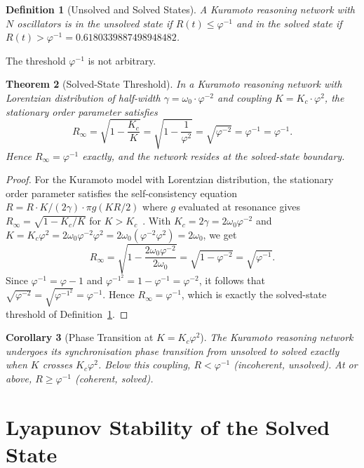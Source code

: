 \documentclass[12pt]{article}
\newtheorem{theorem}{Theorem}
\newtheorem{corollary}[theorem]{Corollary}
\newtheorem{definition}[theorem]{Definition}
\newcommand{\PHI}{\varphi}
\newcommand{\PHIINV}{\varphi^{-1}}
\newcommand{\AMOR}{\varphi^{-2}}
\begin{document}
\begin{definition}[Unsolved and Solved States]
\label{def:states}
A Kuramoto reasoning network with $N$ oscillators is in the \emph{unsolved
state} if $R(t) \le \PHIINV$ and in the \emph{solved state} if $R(t) > \PHIINV
= 0.6180339887498948482$.
\end{definition}

The threshold $\PHIINV$ is not arbitrary.

\begin{theorem}[Solved-State Threshold]
\label{thm:solved-threshold}
In a Kuramoto reasoning network with Lorentzian distribution of half-width
$\gamma = \omega_0 \cdot \AMOR$ and coupling $K = K_c \cdot \PHI^2$, the
stationary order parameter satisfies
\[
  R_\infty = \sqrt{1 - \frac{K_c}{K}} = \sqrt{1 - \frac{1}{\PHI^2}} =
  \sqrt{\AMOR} = \PHI^{-1} = \PHIINV.
\]
Hence $R_\infty = \PHIINV$ exactly, and the network resides at the solved-state
boundary.
\end{theorem}

\begin{proof}
For the Kuramoto model with Lorentzian distribution, the stationary order
parameter satisfies the self-consistency equation $R = R \cdot K/(2\gamma) \cdot
\pi g(K R / 2)$ where $g$ evaluated at resonance gives $R_\infty =
\sqrt{1 - K_c/K}$ for $K > K_c$~\cite{Strogatz2000}.  With $K_c = 2\gamma =
2\omega_0\AMOR$ and $K = K_c \PHI^2 = 2\omega_0\AMOR\PHI^2 = 2\omega_0
(\AMOR\PHI^2) = 2\omega_0$, we get
\[
  R_\infty = \sqrt{1 - \frac{2\omega_0\AMOR}{2\omega_0}} = \sqrt{1 - \AMOR} =
  \sqrt{\PHIINV} .
\]
Since $\PHIINV = \PHI - 1$ and $\PHIINV^2 = 1 - \PHIINV = \AMOR$, it follows
that $\sqrt{\AMOR} = \sqrt{\PHIINV^2} = \PHIINV$.  Hence $R_\infty = \PHIINV$,
which is exactly the solved-state threshold of Definition~\ref{def:states}.
\end{proof}

\begin{corollary}[Phase Transition at $K = K_c\PHI^2$]
The Kuramoto reasoning network undergoes its synchronisation phase transition
from unsolved to solved exactly when $K$ crosses $K_c\PHI^2$.  Below this
coupling, $R < \PHIINV$ (incoherent, unsolved).  At or above, $R \ge \PHIINV$
(coherent, solved).
\end{corollary}

\section{Lyapunov Stability of the Solved State}
\label{sec:lyapunov}
\end{document}
